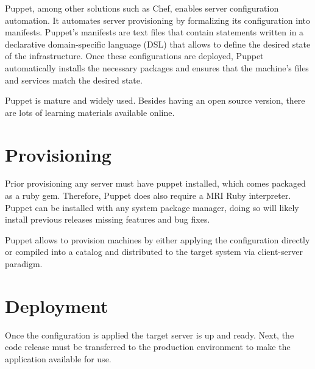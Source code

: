Puppet, among other solutions such as Chef, enables server configuration automation. It automates server provisioning by formalizing its configuration into manifests. Puppet's manifests are text files that contain statements written in a declarative domain-specific language (DSL) that allows to define the desired state of the infrastructure. Once these configurations are deployed, Puppet automatically installs the necessary packages and ensures that the machine’s files and services match the desired state.


Puppet is mature and widely used. Besides having an open source version, there are lots of learning materials available online.

\section{Provisioning}

Prior provisioning any server must have puppet installed, which comes packaged as a ruby gem. Therefore, Puppet does also require a MRI Ruby interpreter. Puppet can be installed with any system package manager, doing so will likely install previous releases missing features and bug fixes.

Puppet allows to provision machines by either applying the configuration directly or compiled into a catalog and distributed to the target system via client-server paradigm.

\section{Deployment}

Once the configuration is applied the target server is up and ready. Next, the code release must be transferred to the production environment to make the application available for use.